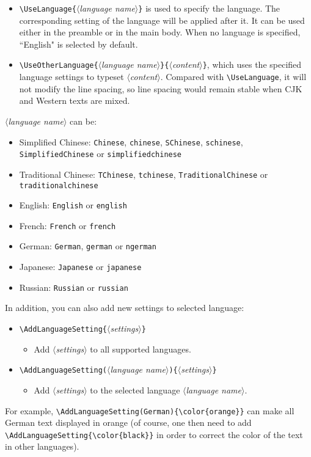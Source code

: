\documentclass{simplivre}
\providecommand{\meta}[1]{$\langle${\normalfont\itshape#1}$\rangle$}
\begin{document}
\begin{itemize}
    \item \lstinline|\UseLanguage{|\meta{language name}\lstinline|}| is used to specify the language. The corresponding setting of the language will be applied after it. It can be used either in the preamble or in the main body. When no language is specified, ``English" is selected by default.
    \item \lstinline|\UseOtherLanguage{|\meta{language name}\lstinline|}{|\meta{content}\lstinline|}|, which uses the specified language settings to typeset \meta{content}. Compared with \lstinline|\UseLanguage|, it will not modify the line spacing, so line spacing would remain stable when CJK and Western texts are mixed.
\end{itemize}

\meta{language name} can be:
\begin{itemize}
    \item Simplified Chinese: \texttt{Chinese}, \texttt{chinese}, \texttt{SChinese}, \texttt{schinese}, \texttt{SimplifiedChinese} or \texttt{simplifiedchinese}
    \item Traditional Chinese: \texttt{TChinese}, \texttt{tchinese}, \texttt{TraditionalChinese} or \texttt{traditionalchinese}
    \item English: \texttt{English} or \texttt{english}
    \item French: \texttt{French} or \texttt{french}
    \item German: \texttt{German}, \texttt{german} or \texttt{ngerman}
    \item Japanese: \texttt{Japanese} or \texttt{japanese}
    \item Russian: \texttt{Russian} or \texttt{russian}
\end{itemize}

\medskip
In addition, you can also add new settings to selected language:
\begin{itemize}
    \item \lstinline|\AddLanguageSetting{|\meta{settings}\lstinline|}|
    \begin{itemize}
        \item Add \meta{settings} to all supported languages.
    \end{itemize}
    \item \lstinline|\AddLanguageSetting(|\meta{language name}\lstinline|){|\meta{settings}\lstinline|}|
    \begin{itemize}
        \item Add \meta{settings} to the selected language \meta{language name}.
    \end{itemize}
\end{itemize}
For example, \lstinline|\AddLanguageSetting(German){\color{orange}}| can make all German text displayed in orange (of course, one then need to add \lstinline|\AddLanguageSetting{\color{black}}| in order to correct the color of the text in other languages).
\end{document}
